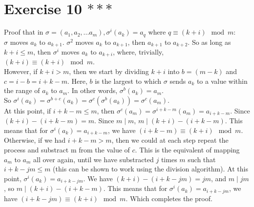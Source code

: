 \documentclass{article}
\begin{document}
    \section*{Exercise 10 $***$}
    Proof that in $\sigma = (a_1, a_2, ... a_m), \sigma^i(a_k) = a_q$
    where $q \equiv (k + i) \mod m$: \\
    $\sigma$ moves $a_k$ to $a_{k+1}$.
    $\sigma^2$ moves $a_k$ to $a_{k+1}$, then $a_{k+1}$ to $a_{k+2}$.
    So as long as $k + i \leqslant m$,
    then $\sigma^i$ moves $a_k$ to $a_{k+i}$,
    where, trivially, $(k + i) \equiv (k + i) \mod m$. \\
    However, if $k + i > m$,
    then we start by dividing $k + i$ into $b = (m - k)$
    and $c = i - b = i + k - m$.
    Here, $b$ is the largest to which $\sigma$ sends $a_k$ to a value 
    within the range of $a_k$ to $a_m$.
    In other words, $\sigma^b(a_k) = a_m$. \\
    So $\sigma^i(a_k) = \sigma^{b + c}(a_k)
    = \sigma^c(\sigma^b(a_k))
    = \sigma^c(a_m)$. \\
    At this point, if $i + k - m \leqslant m$,
    then $\sigma^c(a_m) = \sigma^{i + k - m}(a_m) = a_{i + k - m}$.
    Since $(k + i) - (i + k - m) = m$.
    Since $m \mid m$, $m \mid (k + i) - (i + k - m)$.
    This means that for $\sigma^i(a_k) = a_{i + k - m}$,
    we have $(i + k - m) \equiv (k + i) \mod m$.
    Otherwise, if we had $i + k - m > m$,
    then we could at each step repeat the process and substract m from
    the value of $c$.
    This is the equivalent of mapping $a_m$ to $a_m$ all over again,
    until we have substracted $j$ times $m$ such that $i + k - jm \leqslant m$
    (this can be shown to work using the division algorithm).
    At this point, $\sigma^i(a_k) = a_{i + k - jm}$.
    We have $(k + i) - (i + k - jm) = jm$,
    and $m \mid jm$,
    so $m \mid (k + i) - (i + k - m)$.
    This means that for $\sigma^i(a_k) = a_{i + k - jm}$,
    we have $(i + k - jm) \equiv (k + i) \mod m$.
    Which completes the proof.
\end{document}
